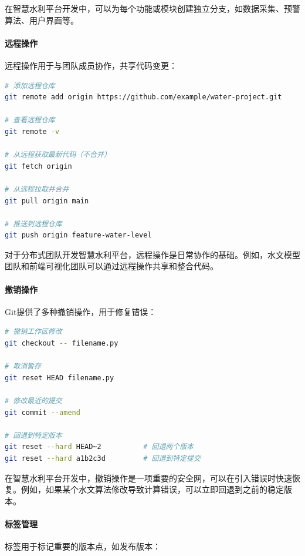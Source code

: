 在智慧水利平台开发中，可以为每个功能或模块创建独立分支，如数据采集、预警算法、用户界面等。

\paragraph{远程操作}\label{ux8fdcux7a0bux64cdux4f5c}

远程操作用于与团队成员协作，共享代码变更：

\begin{lstlisting}[language=bash]
# 添加远程仓库
git remote add origin https://github.com/example/water-project.git

# 查看远程仓库
git remote -v

# 从远程获取最新代码（不合并）
git fetch origin

# 从远程拉取并合并
git pull origin main

# 推送到远程仓库
git push origin feature-water-level
\end{lstlisting}

对于分布式团队开发智慧水利平台，远程操作是日常协作的基础。例如，水文模型团队和前端可视化团队可以通过远程操作共享和整合代码。

\paragraph{撤销操作}\label{ux64a4ux9500ux64cdux4f5c}

Git提供了多种撤销操作，用于修复错误：

\begin{lstlisting}[language=bash]
# 撤销工作区修改
git checkout -- filename.py

# 取消暂存
git reset HEAD filename.py

# 修改最近的提交
git commit --amend

# 回退到特定版本
git reset --hard HEAD~2          # 回退两个版本
git reset --hard a1b2c3d         # 回退到特定提交
\end{lstlisting}

在智慧水利平台开发中，撤销操作是一项重要的安全网，可以在引入错误时快速恢复。例如，如果某个水文算法修改导致计算错误，可以立即回退到之前的稳定版本。

\paragraph{标签管理}\label{ux6807ux7b7eux7ba1ux7406}

标签用于标记重要的版本点，如发布版本：

